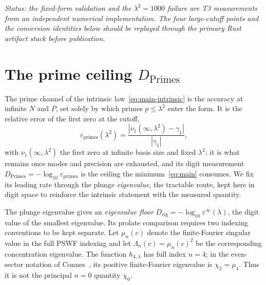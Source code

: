 \documentclass[11pt,a4paper]{article}
\begin{document}
\emph{Status: the fixed-form validation and the $\lambda^2=1000$ failure are
T3 measurements from an independent numerical implementation. The four
large-cutoff points and the conversion identities below should be replayed
through the primary Rust artifact stack before publication.}

\section{The prime ceiling $D_{\mathrm{Primes}}$}\label{sec:primes}

The prime channel of the intrinsic law~\eqref{eq:main-intrinsic} is the accuracy
at infinite $N$ and $P$, set solely by which primes $p\le\lambda^2$ enter the
form. It is the relative error of the first zero at the cutoff,
\begin{equation}\label{eq:epsprimes}
  \varepsilon_{\mathrm{primes}}(\lambda^2)
  =\frac{|\nu_1(\infty,\lambda^2)-\gamma_1|}{|\gamma_1|},
\end{equation}
with $\nu_1(\infty,\lambda^2)$ the first zero at infinite basis size and fixed
$\lambda^2$: it is what remains once modes and precision are exhausted, and its
digit measurement $D_{\mathrm{Primes}}=-\log_{10}\varepsilon_{\mathrm{primes}}$ is
the ceiling the minimum~\eqref{eq:main} consumes. We fix its leading rate through
the plunge \emph{eigenvalue}, the tractable route, kept here in digit space to
reinforce the intrinsic statement with the measured quantity.

The plunge eigenvalue gives an \emph{eigenvalue floor}
$D_{\mathrm{eig}}=-\log_{10}\varepsilon^\infty(\lambda)$, the digit value of the
smallest eigenvalue. Its prolate comparison requires two indexing conventions
to be kept separate. Let $\mu_n(c)$ denote the finite-Fourier singular value in
the full PSWF indexing and let $\Lambda_n(c)=\mu_n(c)^2$ be the corresponding
concentration eigenvalue. The function $h_{4,\lambda}$ has full index $n=4$;
in the even-sector notation of Connes~\cite[\S6.3]{Connes2026}, its positive
finite-Fourier eigenvalue is $\chi_2=\mu_4$. Thus it is not the principal
$n=0$ quantity $\chi_0$.
\end{document}
